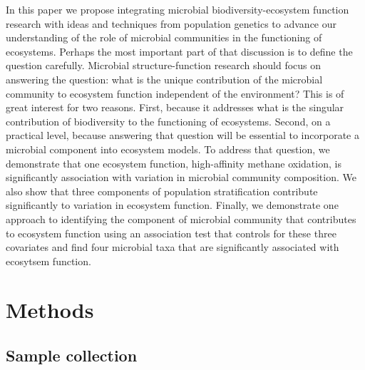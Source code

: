 \documentclass{article}
\begin{document}

In this paper we propose integrating microbial biodiversity-ecosystem function
research with ideas and techniques from population genetics to advance our
understanding of the role of microbial communities in the functioning of
ecosystems. Perhaps the most important part of that discussion is to define the
question carefully. Microbial structure-function research should focus on answering the question: what is the
unique contribution of the microbial community to ecosystem function independent
of the environment? This is of
great interest for two reasons. First, because it addresses what is the singular
contribution of biodiversity to the functioning of ecosystems. Second, on a
practical level, because answering that question will be essential to
incorporate a microbial component into ecosystem models. To address that
question, we demonstrate that one ecosystem function, high-affinity methane
oxidation, is significantly association with variation in microbial community
composition. We also show that three components of population stratification
contribute significantly to variation in ecosystem function. Finally, we
demonstrate one approach to identifying the component of microbial
community that contributes to ecosystem function using an association test that
controls for these three
covariates and find four microbial taxa that are significantly associated with
ecosytsem function.

\section{Methods}

\subsection{Sample collection}
\end{document}

